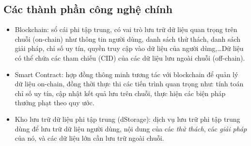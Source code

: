 \subsection{Các thành phần công nghệ chính}
\begin{itemize}
  \item Blockchain: sổ cái phi tập trung, có vai trò lưu trữ dữ liệu quan trọng trên chuỗi (on-chain) như thông tin người dùng, danh sách thử thách, danh sách giải pháp, chỉ số uy tín, quyền truy cập vào dữ liệu của người dùng,\dots Dữ liệu có thể chứa các tham chiếu (CID) của các dữ liệu lưu ngoài chuỗi (off-chain).
  \item Smart Contract: hợp đồng thông minh tương tác với blockchain để quản lý dữ liệu on-chain, đồng thời thực thi các tiến trình quan trọng như: tính toán chỉ số uy tín, cập nhật kết quả lưu trên chuỗi, thực hiện các biện pháp thưởng phạt theo quy ước.
  \item Kho lưu trữ dữ liệu phi tập trung (dStorage): dịch vụ lưu trữ phi tập trung dùng để lưu trữ dữ liệu người dùng, nội dung của các \textit{thử thách}, các \textit{giải pháp} của nó, và các dữ liệu lớn cần lưu trữ ngoài chuỗi.
\end{itemize}

